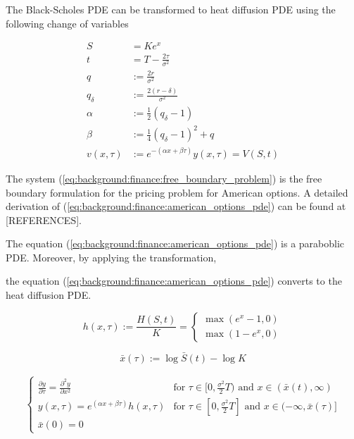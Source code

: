 The Black-Scholes PDE can be transformed to heat diffusion PDE using the following
change of variables

\begin{align*}
  S &= Ke^x \\
  t &= T - \frac{2\tau}{\sigma^2} \\ 
  q &:= \frac{2r}{\sigma^2} \\
  q_{\delta} &:= \frac{2(r-\delta)}{\sigma^2} \\
  \alpha &:= \frac{1}{2}(q_{\delta} - 1) \\
  \beta &:= \frac{1}{4}(q_{\delta} - 1)^2 + q \\
  v(x, \tau) &:= e^{-(\alpha x + \beta \tau)}y(x, \tau)= V(S, t)
\end{align*}

The system (\ref{eq:background:finance:free_boundary_problem}) 
is the free boundary formulation for the pricing problem for American options.
A detailed derivation of (\ref{eq:background:finance:american_options_pde}) 
can be found at [REFERENCES].


The equation (\ref*{eq:background:finance:american_options_pde}) 
is a paraboblic PDE. Moreover, by applying the transformation,


the equation (\ref*{eq:background:finance:american_options_pde}) converts 
to the heat diffusion PDE.

\begin{equation}
  h(x, \tau) := \frac{H(S, t)}{K} = \begin{cases}
    \max(e^{x} - 1, 0)\\
    \max(1 - e^{x}, 0)
  \end{cases} 
\end{equation}

\begin{equation}
  \bar{x}(\tau) := \log{\bar{S}(t)} - \log{K} 
\end{equation}

\begin{align}
  \begin{cases}
    \frac{\partial y}{\partial \tau} = \frac{\partial^2 y}{\partial x^2} & \text{for $\tau\in[0,\frac{\sigma^2}{2}T)$ and $x\in(\bar{x}(t), \infty)$} \\
    y(x, \tau) = e^{(\alpha x + \beta \tau)}h(x, \tau) & \text{for $\tau\in[0, \frac{\sigma^2}{2}T]$ and $x\in(-\infty, \bar{x}(\tau)]$} \\
    \bar{x}(0) = 0
  \end{cases}
  \label{eq:background:finance:american_option_heat_equation}
\end{align}

